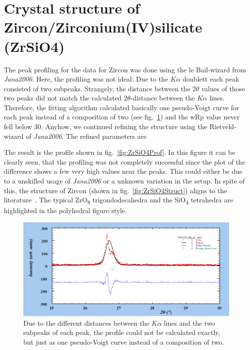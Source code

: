 
\newpage

\section{Crystal structure of Zircon/Zirconium(IV)silicate (ZrSiO4)}
\label{sec:ZrSiO4}

The peak profiling for the data for Zircon was done using the le Bail-wizard from \textit{Jana2006}. Here, the profiling was not ideal: Due to the $K\alpha$ doublett each peak consisted of two subpeaks. Strangely, the distance between the $2\theta$ values of those two peaks did not match the calculated $2\theta$-distance between the $K\alpha$ lines. Therefore, the fitting algorithm calculated basically one pseudo-Voigt curve for each peak instead of a composition of two (see fig.~\ref{fig:demoShitPeaks}) and the wRp value never fell below 30. Anyhow, we continued refining the structure using the Rietveld-wizard of \textit{Jana2006}. The refined parameters are \par 
\centerline{} \par
The result is the profile shown in fig.~\ref{fig:ZrSiO4Prof}. In this figure it can be clearly seen, that the profiling was not completely successful since the plot of the difference shows a few very high values near the peaks. This could either be due to a unskilled usage of \textit{Jana2006} or a unknown variation in the setup. In spite of this, the structure of Zircon (shown in fig.~\ref{fig:ZrSiO4Struct}) aligns to the literature~\cite{Hanchar2003}. The typical ZrO\textsubscript{8} trigondodecahedra and the SiO\textsubscript{4} tetrahedra are highlighted in the polyhedral figure style. 

\begin{figure}[ht]
    \centering
    \includegraphics[angle = 90, width = 0.7\linewidth]{Bilder/Auswertung/ZrSiO4/ZrSiO4DemoPeak.png}
    \caption{Due to the different distances between the $K\alpha$ lines and the two subpeaks of each peak, the profile could not be calculated exactly, but just as one pseudo-Voigt curve instead of a composition of two.}
    \label{fig:demoShitPeaks}  
\end{figure}

